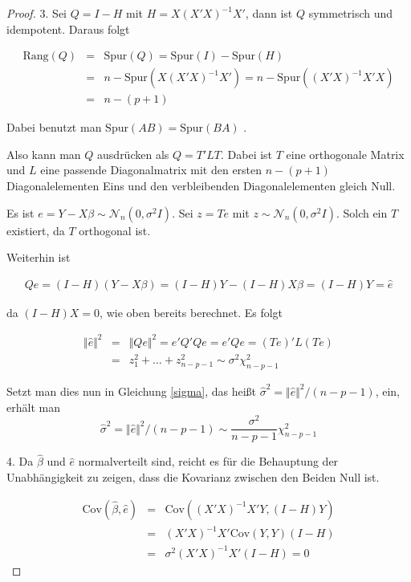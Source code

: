 \documentclass[12pt,a4paper]{article}
\theoremstyle{definition}
\theoremstyle{definition}
\theoremstyle{definition}
\theoremstyle{definition}
\begin{document}
\begin{proof}
3. 
Sei $Q=I-H$ mit $H = X (X'X)^{-1} X'$, dann ist $Q$ symmetrisch und idempotent. Daraus folgt

\begin{eqnarray*}
\text{Rang}(Q) &=& \text{Spur}(Q) = \text{Spur}(I) - \text{Spur}(H) \\
		&=& n - \text{Spur}(X(X'X)^{-1}X') = n - \text{Spur}((X'X)^{-1}X'X) \\
		&=& n - (p+1)
\end{eqnarray*}

Dabei benutzt man $\text{Spur}(AB) = \text{Spur}(BA)$ . 

Also kann man $Q$ ausdrücken als $ Q = T' L T$. Dabei ist $T$ eine orthogonale Matrix und $L$ eine passende Diagonalmatrix mit den ersten $n-(p+1)$ Diagonalelementen Eins und den verbleibenden Diagonalelementen gleich Null.

Es ist $e=Y-X\beta \sim \mathscr{N}_{n}(0,\sigma^2I)$. Sei $z=Te$ mit $z\sim \mathscr{N}_{n}(0,\sigma^2I)$. Solch ein $T$ existiert, da $T$ orthogonal ist. 

Weiterhin ist 

\begin{eqnarray*}
Qe = (I-H) (Y-X\beta) = (I-H)Y - (I-H)X \beta = (I-H)Y = \hat{e}
\end{eqnarray*}

da $(I-H)X=0$, wie oben bereits berechnet. Es folgt

\begin{eqnarray*}
\Vert \hat{e} \Vert^2 &=& \Vert Qe \Vert^2 = e'Q'Qe = e'Qe = (Te)' L (Te) \\
&=& z_1^2 + \ldots + z_{n-p-1}^2 \sim \sigma^2 \chi_{n-p-1}^2
\end{eqnarray*}

Setzt man dies nun in Gleichung \eqref{sigma}, das heißt $ \hat{\sigma}^2 = \Vert \hat{e} \Vert^{2} / (n-p-1) $, ein, erhält man 
\[
\hat{\sigma}^2 = \Vert \hat{e} \Vert^{2} / (n-p-1) \sim \frac{\sigma^2}{n-p-1} \chi_{n-p-1}^2
\]

4. Da $\hat{\beta}$ und $\hat{e}$ normalverteilt sind, reicht es für die Behauptung der Unabhängigkeit zu zeigen, dass die Kovarianz zwischen den Beiden Null ist.

\begin{eqnarray*}
\text{Cov}(\hat{\beta},\hat{e}) &=& \text{Cov}((X'X)^{-1} X' Y, (I-H)Y) \\
&=& (X'X)^{-1} X' \text{Cov}(Y,Y) (I-H) \\
&=& \sigma^2 (X'X)^{-1} X' (I-H) = 0
\end{eqnarray*}

\end{proof}
\end{document}
